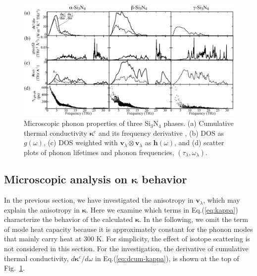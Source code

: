 \documentclass[twocolumn,amsmath,amssymb,a4paper,prb,superscriptaddress,floatfix]{revtex4-1}
\begin{document}
\begin{figure}[h]
         \includegraphics[width=0.9\linewidth]{figure_dos_jdos_dkc_m1010_dos_wo_arrows_bw_nolog.pdf}
  \caption{Microscopic phonon properties of three Si$_3$N$_4$
          phases. (a) Cumulative thermal conductivity $\boldsymbol{\kappa}^\text{c}$ and
          its frequency derivative
          , (b) DOS as $g(\omega)$, (c) DOS weighted with $\mathbf{v}_\lambda \otimes
          \mathbf{v}_\lambda$ as $\boldsymbol{h}(\omega)$, and (d) scatter plots of phonon
          lifetimes and phonon frequencies, $(\tau_\lambda,\omega_\lambda)$.
  \label{fig:Fig5_338_rev} }
\end{figure}
\twocolumngrid

\subsection{Microscopic analysis on $\boldsymbol{\kappa}$ behavior}

In the previous section, we have investigated the anisotropy in
$\mathbf{v}_\lambda$, which may explain the anisotropy in $\boldsymbol{\kappa}$.
Here we examine which terms in Eq.(\ref{eq:kappa}) characterize the behavior of
the calculated $\boldsymbol{\kappa}$. In the following, we omit the term of mode
heat capacity because it is approximately constant for the phonon modes that
mainly carry heat at 300 K. For simplicity, the effect of isotope scattering is
not considered in this section.
For the investigation, the derivative of
cumulative thermal conductivity, $d\boldsymbol{\kappa}^c/d\omega$ in
Eq.(\ref{eq:dcum-kappa}), is shown at the top of Fig.~\ref{fig:Fig5_338_rev}.
\end{document}

